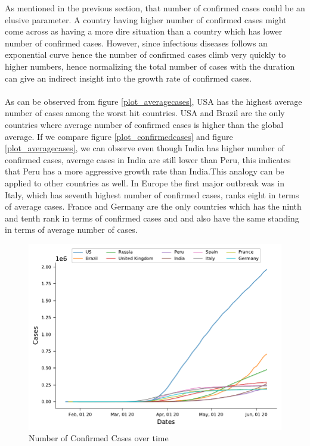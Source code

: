 \documentclass[12pt, twosided]{report}  %
\begin{document}
As mentioned in the previous section, that number of confirmed cases could be an elusive parameter. A country having higher number of confirmed cases might come across as having a more dire situation than a country which has lower number of confirmed cases. However, since infectious diseases follows an exponential curve hence the number of confirmed cases climb very quickly to higher numbers, hence normalizing the total number of cases with the duration can give an indirect insight into the growth rate of confirmed cases.
\\
\\
As can be observed from figure \ref{plot_averagecases}, USA has the highest average number of cases among the worst hit countries. USA and Brazil are the only countries where average number of confirmed cases is higher than the global average. If we compare figure \ref{plot_confirmedcases} and figure \ref{plot_averagecases}, we can observe even though India has higher number of confirmed cases, average cases in India are still lower than Peru, this indicates that Peru has a more aggressive growth rate than India.This analogy can be applied to other countries as well. In Europe the first major outbreak was in Italy, which has seventh highest number of confirmed cases, ranks eight in terms of average cases. France and Germany are the only countries which has the ninth and tenth rank in terms of confirmed cases and and also have the same standing in terms of average number of cases.

\begin{figure}[H]
	\centering
	\includegraphics[width=0.5\linewidth]{./images/plot-3.pdf}
	\caption{Number of Confirmed Cases over time}
	\label{plot_caseprogression}
\end{figure}
\end{document}
